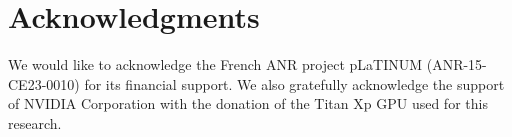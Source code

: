 \section*{Acknowledgments}

We would like to acknowledge the French ANR project pLaTINUM (ANR-15-CE23-0010) for its financial support. We also gratefully acknowledge the support of NVIDIA Corporation with the donation of the Titan Xp GPU used for this research.
